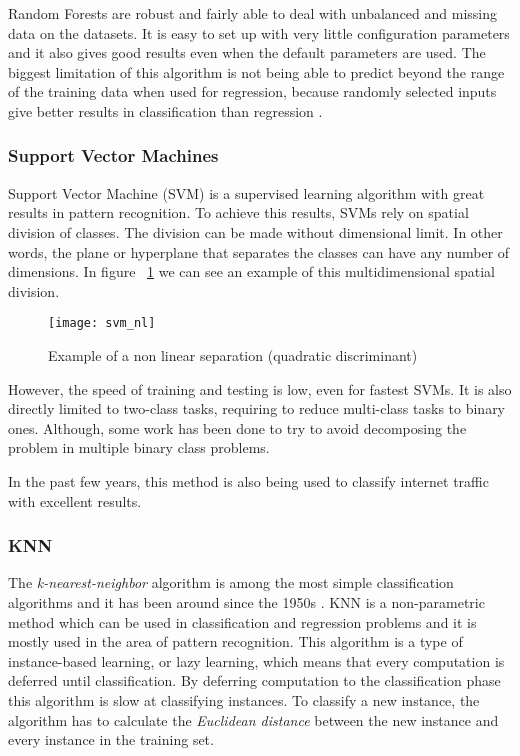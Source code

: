 Random Forests are robust and fairly able to deal with unbalanced and missing data on the datasets. It is easy to set up with very little configuration
parameters and it also gives good results even when the default parameters are used. The biggest limitation of this algorithm is not being able to
predict beyond the range of the training data when used for regression, because randomly selected inputs give better results in classification than regression \cite{raey}.

\subsubsection{Support Vector Machines}

Support Vector Machine (SVM) is a supervised learning algorithm with great results in pattern recognition.
\cite{Cortes95support-vectornetworks} To achieve this results, SVMs rely on spatial division of classes. The division can be
made without dimensional limit. In other words, the plane or hyperplane that separates the classes can have any number of dimensions. In figure
~\ref{fig:svm_nonlin} we can see an example of this multidimensional spatial division.

\begin{figure}[h]
  \begin{center}
    \leavevmode
    \texttt{[image: svm\_nl]}
    \caption{Example of a non linear separation (quadratic discriminant)\cite{Bennett03supportvector}}
    \label{fig:svm_nonlin}
  \end{center}
\end{figure}

However, the speed of training and testing is low, even for fastest SVMs.
It is also directly limited to two-class tasks\cite{Cortes95support-vectornetworks},
requiring to reduce multi-class tasks to binary ones. Although, some work has been done to try to avoid
decomposing the problem in multiple binary class problems.\cite{Crammer:2002:AIM:944790.944813}

In the past few years, this method is also being used to classify internet traffic with excellent results.\cite{Yuan2010}


\subsubsection{KNN}

The \emph{k-nearest-neighbor} algorithm is among the most simple classification algorithms and it has been around since the 1950s \cite[p.348]{HanKam06}.
KNN is a non-parametric method which can be used in classification and regression problems and it is mostly used in the area of pattern recognition.
This algorithm is a type of instance-based learning, or lazy learning, which means that every computation is deferred until classification. By deferring 
computation to the classification phase this algorithm is slow at classifying instances. To classify a new instance, the algorithm has to calculate
the \emph{Euclidean distance} between the new instance and every instance in the training set.


